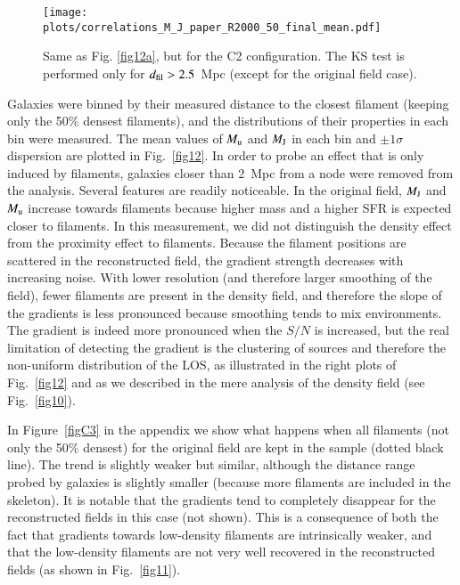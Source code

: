 \documentclass{aa}
\begin{document}
\begin{figure*}
\begin{center}
\texttt{[image: plots/correlations\_M\_J\_paper\_R2000\_50\_final\_mean.pdf]}
\caption{Same as Fig. \ref{fig12a}, but for the C2 configuration. The KS test is performed only for  $d_{\rm fil} > 2.5$~Mpc (except for the original field case).}
\label{fig12b}
\end{center}
\end{figure*}

Galaxies were binned by their measured distance to the closest filament (keeping only the 50\% densest filaments), and the distributions of their properties in each bin were measured. The mean values of ${\it M}_{\rm u}$ and ${\it M}_{\rm J}$ in each bin and $\pm 1\sigma$ dispersion are plotted in Fig.~\ref{fig12}. In order to probe an effect that is only induced by filaments, galaxies closer than 2~Mpc from a node were removed from the analysis. Several features are readily noticeable. In the original field,  ${\it M}_{\rm J}$ and ${\it M}_{\rm u}$ increase towards filaments because higher mass and a higher SFR is expected closer to filaments. In this measurement, we did not distinguish the density effect from the proximity effect to filaments. Because the filament positions are scattered in the reconstructed field, the gradient strength decreases with increasing noise. With lower resolution (and therefore larger smoothing of the  field), fewer filaments are present in the density field, and therefore the slope of the gradients is less pronounced because smoothing tends to mix environments. The gradient is indeed more pronounced when the $S/N$ is increased, but the real limitation of detecting the gradient is the clustering of sources and therefore the non-uniform distribution of the LOS, as illustrated in the right plots of Fig.~\ref{fig12} and as we described in the mere analysis of the density field (see Fig.~\ref{fig10}).

In Figure~\ref{figC3} in the appendix we show what happens when all filaments (not only the 50\% densest) for the original field are kept in the sample (dotted black line). The trend is slightly weaker but similar, although the distance range probed by galaxies is slightly smaller (because more filaments are included in the skeleton). It is notable that the gradients tend to completely disappear for the reconstructed fields in this case (not shown). This is a consequence of both the fact that gradients towards low-density filaments are intrinsically weaker, and that the low-density filaments are not very well recovered in the reconstructed fields (as shown in Fig.~\ref{fig11}).
\end{document}
